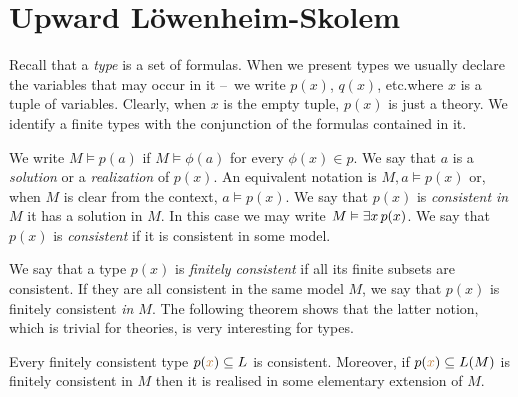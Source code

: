\documentclass[creche.tex]{subfiles}
\begin{document}
\section{Upward Löwenheim-Skolem}

\def\ceq#1#2#3{\parbox{13ex}{$\displaystyle #1$}\parbox{4ex}{\hfil$#2$}$\displaystyle #3$}
 
Recall that a \emph{type\/} is a set of formulas. When we present types we usually declare the variables that may occur in it --~we write \emph{$p(x)$}, \emph{$q(x)$}, etc.\@ where $x$ is a tuple of variables. Clearly, when $x$ is the empty tuple, $p(x)$ is just a theory. We identify a finite types with the conjunction of the formulas contained in it.

We write \emph{$M\models p(a)$} if $M\models\phi(a)$ for every $\phi(x)\in p$.  We say that $a$ is a \emph{solution\/} or a \emph{realization\/} of $p(x)$. An equivalent notation is \emph{$M,a\models p(x)$} or, when $M$ is clear from the context, \emph{$a\models p(x)$}. We say that $p(x)$ is \emph{consistent in $M$\/} it has a solution in $M$. In this case we may write \emph{$M\vDash\exists x\,p(x)$}.  We say that $p(x)$ is \emph{consistent\/} if it is consistent in some model.

We say that a type $p(x)$ is \emph{finitely consistent\/} if all its finite subsets are consistent. If they are all consistent in the same model $M$, we say that $p(x)$ is finitely consistent \emph{in $M$}. The following theorem shows that the latter notion, which is trivial for theories, is very interesting for types.

\begin{void_thm}\label{thm_compattezzatipi}
Every finitely consistent type $p({\color{brown} x})\subseteq L$ is consistent. Moreover, if $p({\color{brown} x})\subseteq L(M)$ is finitely consistent in $M$ then it is realised in some elementary extension of $M$.
\end{void_thm}
\end{document}
